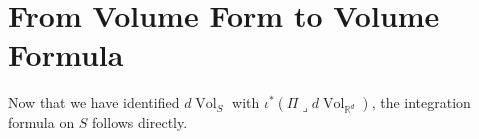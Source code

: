 \documentclass{article}
\renewcommand\det{\operatorname{det}}
\newcommand{\p}{\partial}
\newcommand{\R}{\mathbb{R}}
\newcommand{\iprod}{\mathbin{\lrcorner}}
\theoremstyle{theorem}
\newcommand{\Vol}{\operatorname{Vol}}
\begin{document}
















\section{From Volume Form to Volume Formula}

Now that we have identified $d\Vol_S$ with $\iota^*(\Pi \iprod d\Vol_{\R^d})$, the integration formula on $S$ follows directly. 
\end{document}
